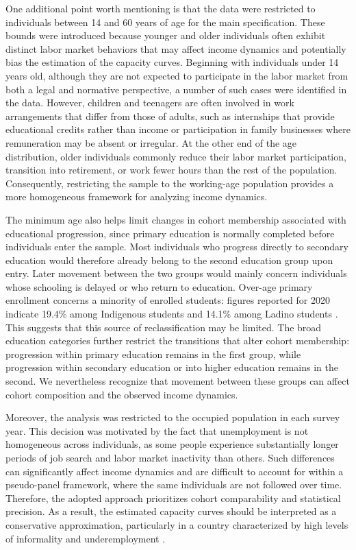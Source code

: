 \documentclass{article}
\begin{document}
One additional point worth mentioning is that the data were restricted to individuals between 14 and 60 years of age for the main specification. These bounds were introduced because younger and older individuals often exhibit distinct labor market behaviors that may affect income dynamics and potentially bias the estimation of the capacity curves. Beginning with individuals under 14 years old, although they are not expected to participate in the labor market from both a legal and normative perspective, a number of such cases were identified in the data. However, children and teenagers are often involved in work arrangements that differ from those of adults, such as internships that provide educational credits rather than income or participation in family businesses where remuneration may be absent or irregular. At the other end of the age distribution, older individuals commonly reduce their labor market participation, transition into retirement, or work fewer hours than the rest of the population. Consequently, restricting the sample to the working-age population provides a more homogeneous framework for analyzing income dynamics.

The minimum age also helps limit changes in cohort membership associated with educational progression, since primary education is normally completed before individuals enter the sample. Most individuals who progress directly to secondary education would therefore already belong to the second education group upon entry. Later movement between the two groups would mainly concern individuals whose schooling is delayed or who return to education. Over-age primary enrollment concerns a minority of enrolled students: figures reported for 2020 indicate 19.4\% among Indigenous students and 14.1\% among Ladino students \parencite[Table VII.6, p.~208]{huenchuan2024inequality}. This suggests that this source of reclassification may be limited. The broad education categories further restrict the transitions that alter cohort membership: progression within primary education remains in the first group, while progression within secondary education or into higher education remains in the second. We nevertheless recognize that movement between these groups can affect cohort composition and the observed income dynamics.

Moreover, the analysis was restricted to the occupied population in each survey year. This decision was motivated by the fact that unemployment is not homogeneous across individuals, as some people experience substantially longer periods of job search and labor market inactivity than others. Such differences can significantly affect income dynamics and are difficult to account for within a pseudo-panel framework, where the same individuals are not followed over time. Therefore, the adopted approach prioritizes cohort comparability and statistical precision. As a result, the estimated capacity curves should be interpreted as a conservative approximation, particularly in a country characterized by high levels of informality and underemployment \parencite{ine2025eneic}.
\end{document}
